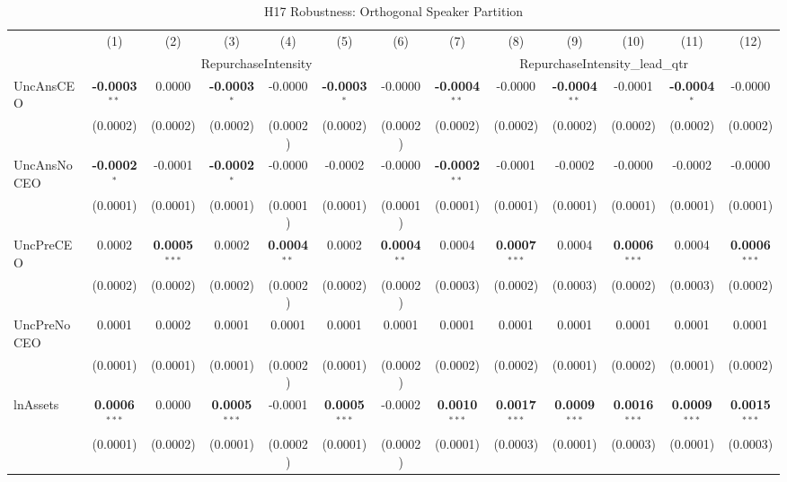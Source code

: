 \documentclass[11pt,a4paper]{article}
\begin{document}
\begin{table}[htbp]
\centering
\caption{H17 Robustness: Orthogonal Speaker Partition}
\label{tab:h17_robust}
\scriptsize
\begin{tabular}{lcccccccccccc}
\toprule
 & (1) & (2) & (3) & (4) & (5) & (6) & (7) & (8) & (9) & (10) & (11) & (12) \\
 & \multicolumn{6}{c}{RepurchaseIntensity} & \multicolumn{6}{c}{RepurchaseIntensity\_lead\_qtr} \\
\cmidrule(lr){2-7} \cmidrule(lr){8-13}
\midrule
UncAnsCEO & \textbf{-0.0003}$^{**}$ & 0.0000 & \textbf{-0.0003}$^{*}$ & -0.0000 & \textbf{-0.0003}$^{*}$ & -0.0000 & \textbf{-0.0004}$^{**}$ & -0.0000 & \textbf{-0.0004}$^{**}$ & -0.0001 & \textbf{-0.0004}$^{*}$ & -0.0000 \\
 & (0.0002) & (0.0002) & (0.0002) & (0.0002) & (0.0002) & (0.0002) & (0.0002) & (0.0002) & (0.0002) & (0.0002) & (0.0002) & (0.0002) \\
UncAnsNoCEO & \textbf{-0.0002}$^{*}$ & -0.0001 & \textbf{-0.0002}$^{*}$ & -0.0000 & -0.0002 & -0.0000 & \textbf{-0.0002}$^{**}$ & -0.0001 & -0.0002 & -0.0000 & -0.0002 & -0.0000 \\
 & (0.0001) & (0.0001) & (0.0001) & (0.0001) & (0.0001) & (0.0001) & (0.0001) & (0.0001) & (0.0001) & (0.0001) & (0.0001) & (0.0001) \\
UncPreCEO & 0.0002 & \textbf{0.0005}$^{***}$ & 0.0002 & \textbf{0.0004}$^{**}$ & 0.0002 & \textbf{0.0004}$^{**}$ & 0.0004 & \textbf{0.0007}$^{***}$ & 0.0004 & \textbf{0.0006}$^{***}$ & 0.0004 & \textbf{0.0006}$^{***}$ \\
 & (0.0002) & (0.0002) & (0.0002) & (0.0002) & (0.0002) & (0.0002) & (0.0003) & (0.0002) & (0.0003) & (0.0002) & (0.0003) & (0.0002) \\
UncPreNoCEO & 0.0001 & 0.0002 & 0.0001 & 0.0001 & 0.0001 & 0.0001 & 0.0001 & 0.0001 & 0.0001 & 0.0001 & 0.0001 & 0.0001 \\
 & (0.0001) & (0.0001) & (0.0001) & (0.0002) & (0.0001) & (0.0002) & (0.0002) & (0.0002) & (0.0001) & (0.0002) & (0.0001) & (0.0002) \\
\midrule
lnAssets & \textbf{0.0006}$^{***}$ & 0.0000 & \textbf{0.0005}$^{***}$ & -0.0001 & \textbf{0.0005}$^{***}$ & -0.0002 & \textbf{0.0010}$^{***}$ & \textbf{0.0017}$^{***}$ & \textbf{0.0009}$^{***}$ & \textbf{0.0016}$^{***}$ & \textbf{0.0009}$^{***}$ & \textbf{0.0015}$^{***}$ \\
 & (0.0001) & (0.0002) & (0.0001) & (0.0002) & (0.0001) & (0.0002) & (0.0001) & (0.0003) & (0.0001) & (0.0003) & (0.0001) & (0.0003) \\

\end{tabular}
\end{table}
\end{document}
